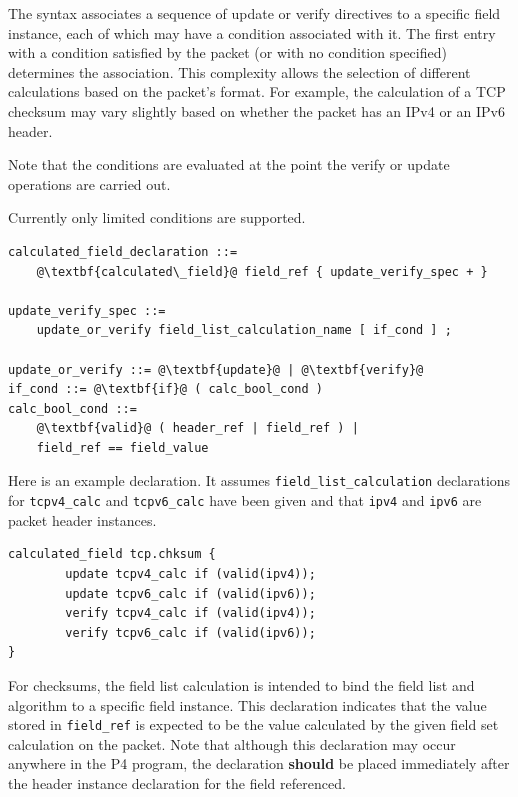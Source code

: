 \documentclass[12pt]{article}
\begin{document}
The syntax associates a sequence of update or verify directives to a
specific field instance, each of which may have a condition associated
with it. The first entry with a condition satisfied by the packet (or
with no condition specified) determines the association. This
complexity allows the selection of different calculations based on the
packet's format. For example, the calculation of a TCP checksum may
vary slightly based on whether the packet has an IPv4 or an IPv6
header.

Note that the conditions are evaluated at the point the verify or
update operations are carried out.

Currently only limited conditions are supported.

\begin{lstlisting}[frame=single,backgroundcolor=\color{bnfgreen},escapechar=\@]
calculated_field_declaration ::=
    @\textbf{calculated\_field}@ field_ref { update_verify_spec + }

update_verify_spec ::=
    update_or_verify field_list_calculation_name [ if_cond ] ;

update_or_verify ::= @\textbf{update}@ | @\textbf{verify}@
if_cond ::= @\textbf{if}@ ( calc_bool_cond )
calc_bool_cond ::=
    @\textbf{valid}@ ( header_ref | field_ref ) |
    field_ref == field_value
\end{lstlisting}

Here is an example declaration. It assumes \texttt{field_list_calculation} declarations 
for \texttt{tcpv4_calc} and \texttt{tcpv6_calc} have been given and that \texttt{ipv4} and \texttt{ipv6} are 
packet header instances.

\begin{lstlisting}[keywords={},frame=single,escapechar=\@]
calculated_field tcp.chksum {
        update tcpv4_calc if (valid(ipv4));
        update tcpv6_calc if (valid(ipv6));
        verify tcpv4_calc if (valid(ipv4));
        verify tcpv6_calc if (valid(ipv6));
}
\end{lstlisting}

For checksums, the field list calculation is intended to bind the field list 
and algorithm to a specific field instance. This declaration indicates that 
the value stored in \texttt{field_ref} is expected to be the value calculated by the 
given field set calculation on the packet. Note that although this declaration 
may occur anywhere in the P4 program, the declaration \textbf{should} be placed immediately 
after the header instance declaration for the field referenced.
\end{document}
